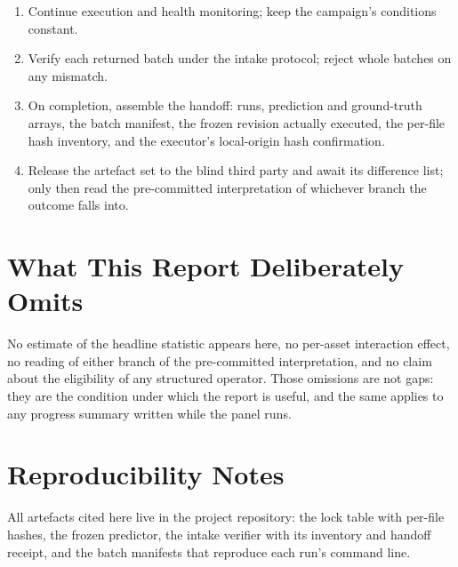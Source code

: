 \documentclass[conference]{IEEEtran}
\begin{document}
\begin{enumerate}
\item Continue execution and health monitoring; keep the campaign's conditions constant.
\item Verify each returned batch under the intake protocol; reject whole batches on any mismatch.
\item On completion, assemble the handoff: runs, prediction and ground-truth arrays, the batch
manifest, the frozen revision actually executed, the per-file hash inventory, and the executor's
local-origin hash confirmation.
\item Release the artefact set to the blind third party and await its difference list; only then read
the pre-committed interpretation of whichever branch the outcome falls into.
\end{enumerate}

\section{What This Report Deliberately Omits}
\label{sec:omit}

No estimate of the headline statistic appears here, no per-asset interaction effect, no reading of
either branch of the pre-committed interpretation, and no claim about the eligibility of any
structured operator. Those omissions are not gaps: they are the condition under which the report is
useful, and the same applies to any progress summary written while the panel runs.

\section*{Reproducibility Notes}

All artefacts cited here live in the project repository: the lock table with per-file hashes, the
frozen predictor, the intake verifier with its inventory and handoff receipt, and the batch manifests
that reproduce each run's command line.
\end{document}
